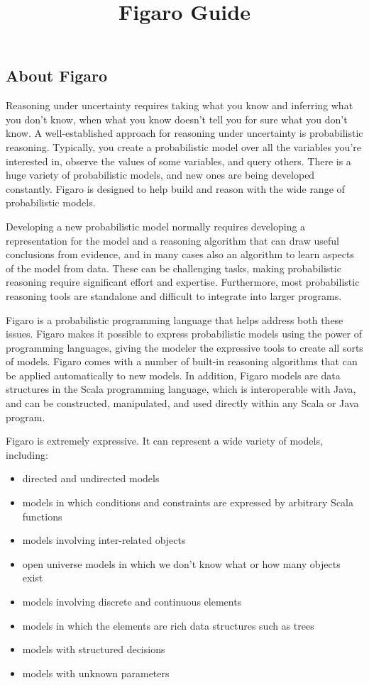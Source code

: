\documentclass[]{article}
\title{Figaro Guide}
\date{}
\begin{document}
\maketitle

\subsection{About Figaro}\label{about-figaro}

Reasoning under uncertainty requires taking what you know and inferring
what you don't know, when what you know doesn't tell you for sure what
you don't know. A well-established approach for reasoning under
uncertainty is probabilistic reasoning. Typically, you create a
probabilistic model over all the variables you're interested in, observe
the values of some variables, and query others. There is a huge variety
of probabilistic models, and new ones are being developed constantly.
Figaro is designed to help build and reason with the wide range of
probabilistic models.

Developing a new probabilistic model normally requires developing a
representation for the model and a reasoning algorithm that can draw
useful conclusions from evidence, and in many cases also an algorithm to
learn aspects of the model from data. These can be challenging tasks,
making probabilistic reasoning require significant effort and expertise.
Furthermore, most probabilistic reasoning tools are standalone and
difficult to integrate into larger programs.

Figaro is a probabilistic programming language that helps address both
these issues. Figaro makes it possible to express probabilistic models
using the power of programming languages, giving the modeler the
expressive tools to create all sorts of models. Figaro comes with a
number of built-in reasoning algorithms that can be applied
automatically to new models. In addition, Figaro models are data
structures in the Scala programming language, which is interoperable
with Java, and can be constructed, manipulated, and used directly within
any Scala or Java program.

Figaro is extremely expressive. It can represent a wide variety of
models, including:

\begin{itemize}
\item
  directed and undirected models
\item
  models in which conditions and constraints are expressed by arbitrary
  Scala functions
\item
  models involving inter-related objects
\item
  open universe models in which we don't know what or how many objects
  exist
\item
  models involving discrete and continuous elements
\item
  models in which the elements are rich data structures such as trees
\item
  models with structured decisions
\item
  models with unknown parameters
\end{itemize}
\end{document}
